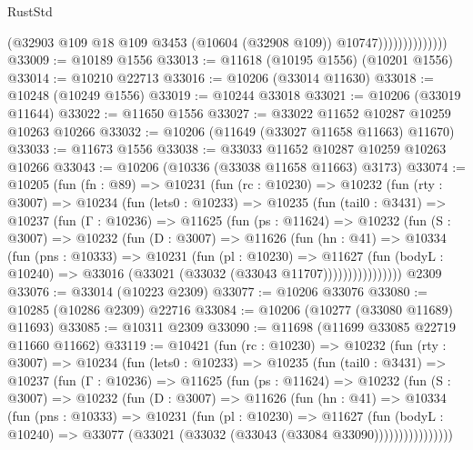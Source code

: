 \begin{lexlean}{RustStd}
\begin{coremodule}
                              (@32903
                                @109
                                @18
                                @109
                                @3453
                                (@10604 (@32908 @109))
                                @10747))))))))))))))
@33009 := @10189 @1556
@33013 := @11618 (@10195 @1556) (@10201 @1556)
@33014 := @10210 @22713
@33016 := @10206 (@33014 @11630)
@33018 := @10248 (@10249 @1556)
@33019 := @10244 @33018
@33021 := @10206 (@33019 @11644)
@33022 := @11650 @1556
@33027 := @33022 @11652 @10287 @10259 @10263 @10266
@33032 := @10206 (@11649 (@33027 @11658 @11663) @11670)
@33033 := @11673 @1556
@33038 := @33033 @11652 @10287 @10259 @10263 @10266
@33043 := @10206 (@10336 (@33038 @11658 @11663) @3173)
@33074 := @10205
    (fun (fn : @89) =>
    @10231
      (fun (rc : @10230) =>
      @10232
        (fun (rty : @3007) =>
        @10234
          (fun (lets0 : @10233) =>
          @10235
            (fun (tail0 : @3431) =>
            @10237
              (fun (Γ : @10236) =>
              @11625
                (fun (ps : @11624) =>
                @10232
                  (fun (S : @3007) =>
                  @10232
                    (fun (D : @3007) =>
                    @11626
                      (fun (hn : @41) =>
                      @10334
                        (fun (pns : @10333) =>
                        @10231
                          (fun (pl : @10230) =>
                          @11627
                            (fun (bodyL : @10240) =>
                            @33016 (@33021 (@33032 (@33043 @11707))))))))))))))))
    @2309
@33076 := @33014 (@10223 @2309)
@33077 := @10206 @33076
@33080 := @10285 (@10286 @2309) @22716
@33084 := @10206 (@10277 (@33080 @11689) @11693)
@33085 := @10311 @2309
@33090 := @11698 (@11699 @33085 @22719 @11660 @11662)
@33119 := @10421
    (fun (rc : @10230) =>
    @10232
      (fun (rty : @3007) =>
      @10234
        (fun (lets0 : @10233) =>
        @10235
          (fun (tail0 : @3431) =>
          @10237
            (fun (Γ : @10236) =>
            @11625
              (fun (ps : @11624) =>
              @10232
                (fun (S : @3007) =>
                @10232
                  (fun (D : @3007) =>
                  @11626
                    (fun (hn : @41) =>
                    @10334
                      (fun (pns : @10333) =>
                      @10231
                        (fun (pl : @10230) =>
                        @11627
                          (fun (bodyL : @10240) =>
                          @33077 (@33021 (@33032 (@33043 (@33084 @33090))))))))))))))))

\end{coremodule}
\end{lexlean}
